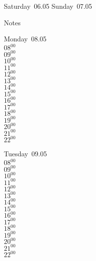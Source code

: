 \documentclass[11pt,a4paper]{book}\usepackage[]{graphicx}\usepackage[]{color}
\begin{document}
\begin{weekendbox}
  Saturday~06.05
  \tcblower
  Sunday~07.05
\end{weekendbox} %
\begin{notebox}
  Notes
\end{notebox}
\clearpage
\begin{headerbox}
\end{headerbox}
\begin{weekdaybox}
  Monday~08.05\\
  { 
  \vfill
  $08^{00}$\\
$09^{00}$\\
$10^{00}$\\
$11^{00}$\\
$12^{00}$\\
$13^{00}$\\
$14^{00}$\\
$15^{00}$\\
$16^{00}$\\
$17^{00}$\\
$18^{00}$\\
$19^{00}$\\
$20^{00}$\\
$21^{00}$\\
$22^{00}$\\
  }
\end{weekdaybox}
\begin{weekdaybox}
  Tuesday~09.05\\
  { 
  \vfill
  $08^{00}$\\
$09^{00}$\\
$10^{00}$\\
$11^{00}$\\
$12^{00}$\\
$13^{00}$\\
$14^{00}$\\
$15^{00}$\\
$16^{00}$\\
$17^{00}$\\
$18^{00}$\\
$19^{00}$\\
$20^{00}$\\
$21^{00}$\\
$22^{00}$\\
  }
\end{weekdaybox}
\end{document}
